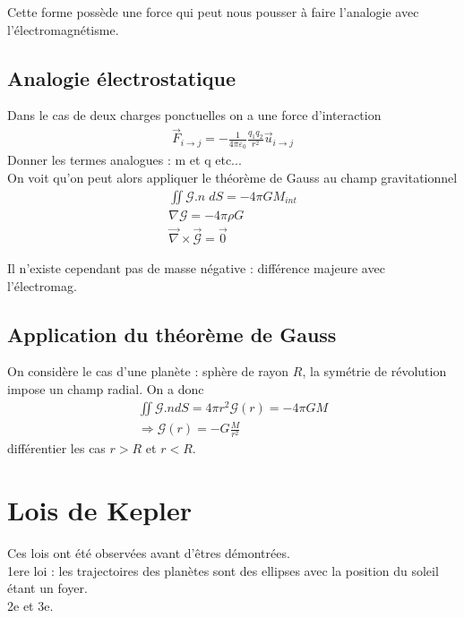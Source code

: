 \documentclass[12pt,prb,aps,epsf]{article}
\begin{document}
Cette forme possède une force qui peut nous pousser à faire l'analogie avec l'électromagnétisme.

\subsection{Analogie électrostatique}
Dans le cas de deux charges ponctuelles on a une force d'interaction
\begin{eqnarray}
\vec{F}_{i\rightarrow j} = -\frac{1}{4\pi\varepsilon_0}\frac{q_1q_2}{r^2} \vec{u}_{i\rightarrow j}
\end{eqnarray}
Donner les termes analogues : m et q etc...\\

On voit qu'on peut alors appliquer le théorème de Gauss au champ gravitationnel 
\begin{eqnarray}
\iint \mathcal{G}.n \;dS = -4\pi G M_{int}\\
\nabla \mathcal{G} = -4\pi \rho G\\
\vec{\nabla}\times\vec{\mathcal{G}} = \vec{0}
\end{eqnarray}

Il n'existe cependant pas de masse négative : différence majeure avec l'électromag.


\subsection{Application du théorème de Gauss}
On considère le cas d'une planète : sphère de rayon $R$, la symétrie de révolution impose un champ radial. On a donc 
\begin{eqnarray}
\iint \mathcal{G} .n dS = 4\pi r^2 \mathcal{G}(r) = -4\pi GM\\
\Rightarrow \mathcal{G}(r) = -G\frac{M}{r^2}
\end{eqnarray}
différentier les cas $r>R$ et $r<R$.

\section{Lois de Kepler}
Ces lois ont été observées avant d'êtres démontrées. \\
1ere loi : les trajectoires des planètes sont des ellipses avec la position du soleil étant un foyer.\\
2e et 3e.
\end{document}
